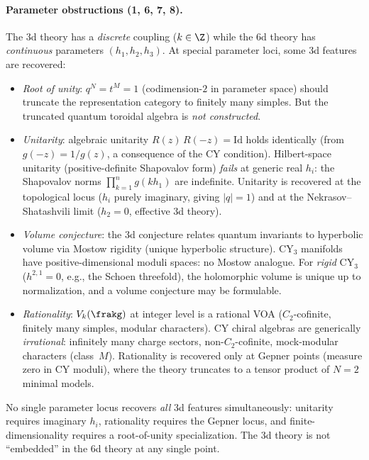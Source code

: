 \paragraph{Parameter obstructions (1, 6, 7, 8).}
The 3d theory has a \emph{discrete} coupling ($k \in \Z$) while the 6d theory has \emph{continuous} parameters $(h_1, h_2, h_3)$. At special parameter loci, some 3d features are recovered:
\begin{itemize}
 \item \emph{Root of unity}: $q^N = t^M = 1$ (codimension-$2$ in parameter space) should truncate the representation category to finitely many simples. But the truncated quantum toroidal algebra is \emph{not constructed}.
 \item \emph{Unitarity}: algebraic unitarity $R(z)\,R(-z) = \mathrm{Id}$ holds identically (from $g(-z) = 1/g(z)$, a consequence of the CY condition). Hilbert-space unitarity (positive-definite Shapovalov form) \emph{fails} at generic real $h_i$: the Shapovalov norms $\prod_{k=1}^{n} g(k h_1)$ are indefinite. Unitarity is recovered at the topological locus ($h_i$ purely imaginary, giving $|q| = 1$) and at the Nekrasov--Shatashvili limit ($h_2 = 0$, effective 3d theory).
 \item \emph{Volume conjecture}: the 3d conjecture relates quantum invariants to hyperbolic volume via Mostow rigidity (unique hyperbolic structure). CY$_3$ manifolds have positive-dimensional moduli spaces: no Mostow analogue. For \emph{rigid} CY$_3$ ($h^{2,1} = 0$, e.g., the Schoen threefold), the holomorphic volume is unique up to normalization, and a volume conjecture may be formulable.
 \item \emph{Rationality}: $V_k(\frakg)$ at integer level is a rational VOA ($C_2$-cofinite, finitely many simples, modular characters). CY chiral algebras are generically \emph{irrational}: infinitely many charge sectors, non-$C_2$-cofinite, mock-modular characters (class~$M$). Rationality is recovered only at Gepner points (measure zero in CY moduli), where the theory truncates to a tensor product of $N = 2$ minimal models.
\end{itemize}

No single parameter locus recovers \emph{all} 3d features simultaneously: unitarity requires imaginary $h_i$, rationality requires the Gepner locus, and finite-dimensionality requires a root-of-unity specialization. The 3d theory is not ``embedded'' in the 6d theory at any single point.


